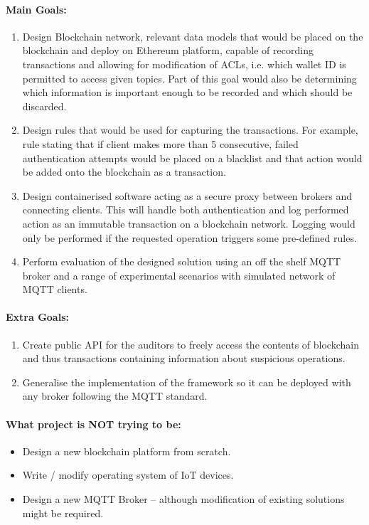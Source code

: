 \documentclass[a4paper,12pt]{article}
\begin{document}
\paragraph{Main Goals:}
\begin{enumerate}
  \item Design Blockchain network, relevant data models that would be placed on the blockchain and deploy on Ethereum platform, capable of recording transactions and allowing for modification of ACLs, i.e. which wallet ID is permitted to access given topics. Part of this goal would also be determining which information is important enough to be recorded and which should be discarded.
  \item Design rules that would be used for capturing the transactions. For example, rule stating that if client makes more than 5 consecutive, failed authentication attempts would be placed on a blacklist and that action would be added onto the blockchain as a transaction. 
  \item Design containerised software acting as a secure proxy between brokers and connecting clients. This will handle both authentication and log performed action as an immutable transaction on a blockchain network. Logging would only be performed if the requested operation triggers some pre-defined rules.
  \item Perform evaluation of the designed solution using an off the shelf MQTT broker and a range of experimental scenarios with simulated network of MQTT clients.
\end{enumerate}

\paragraph{Extra Goals:}
\begin{enumerate}
  \item Create public API for the auditors to freely access the contents of blockchain and thus transactions containing information about suspicious operations.
  \item Generalise the implementation of the framework so it can be deployed with any broker following the MQTT standard.
\end{enumerate}

\paragraph{What project is NOT trying to be:}
\begin{itemize}
  \item Design a new blockchain platform from scratch.
  \item Write / modify operating system of IoT devices.
  \item Design a new MQTT Broker -- although modification of existing solutions might be required.
\end{itemize}
\end{document}
